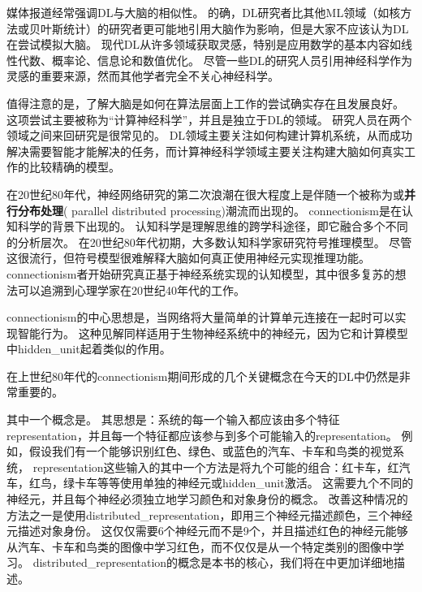 媒体报道经常强调\gls{DL}与大脑的相似性。
的确，\gls{DL}研究者比其他\gls{ML}领域（如核方法或贝叶斯统计）的研究者更可能地引用大脑作为影响，但是大家不应该认为\gls{DL}在尝试模拟大脑。
现代\gls{DL}从许多领域获取灵感，特别是应用数学的基本内容如线性代数、概率论、信息论和数值优化。
尽管一些\gls{DL}的研究人员引用神经科学作为灵感的重要来源，然而其他学者完全不关心神经科学。


值得注意的是，了解大脑是如何在算法层面上工作的尝试确实存在且发展良好。
这项尝试主要被称为``计算神经科学''，并且是独立于\gls{DL}的领域。
研究人员在两个领域之间来回研究是很常见的。
\gls{DL}领域主要关注如何构建计算机系统，从而成功解决需要智能才能解决的任务，而计算神经科学领域主要关注构建大脑如何真实工作的比较精确的模型。

在20世纪80年代，神经网络研究的第二次浪潮在很大程度上是伴随一个被称为或\textbf{并行分布处理}( parallel distributed processing)潮流而出现的\citep{Rumelhart86,mcclelland1995appeal}。
\gls{connectionism}是在认知科学的背景下出现的。
认知科学是理解思维的跨学科途径，即它融合多个不同的分析层次。
在20世纪80年代初期，大多数认知科学家研究符号推理模型。
尽管这很流行，但符号模型很难解释大脑如何真正使用神经元实现推理功能。 
\gls{connectionism}者开始研究真正基于神经系统实现的认知模型\citep{Touretzky1985}，其中很多复苏的想法可以追溯到心理学家在20世纪40年代的工作\citep{Hebb49}。

\gls{connectionism}的中心思想是，当网络将大量简单的计算单元连接在一起时可以实现智能行为。
这种见解同样适用于生物神经系统中的神经元，因为它和计算模型中\gls{hidden_unit}起着类似的作用。

在上世纪80年代的\gls{connectionism}期间形成的几个关键概念在今天的\gls{DL}中仍然是非常重要的。

其中一个概念是\citep{Hinton-et-al-PDP1986}。
其思想是：系统的每一个输入都应该由多个特征\gls{representation}，并且每一个特征都应该参与到多个可能输入的\gls{representation}。
例如，假设我们有一个能够识别红色、绿色、或蓝色的汽车、卡车和鸟类的视觉系统，
\gls{representation}这些输入的其中一个方法是将九个可能的组合：红卡车，红汽车，红鸟，绿卡车等等使用单独的神经元或\gls{hidden_unit}激活。
这需要九个不同的神经元，并且每个神经必须独立地学习颜色和对象身份的概念。
改善这种情况的方法之一是使用\gls{distributed_representation}，即用三个神经元描述颜色，三个神经元描述对象身份。 
这仅仅需要6个神经元而不是9个，并且描述红色的神经元能够从汽车、卡车和鸟类的图像中学习红色，而不仅仅是从一个特定类别的图像中学习。 
\gls{distributed_representation}的概念是本书的核心，我们将在中更加详细地描述。


